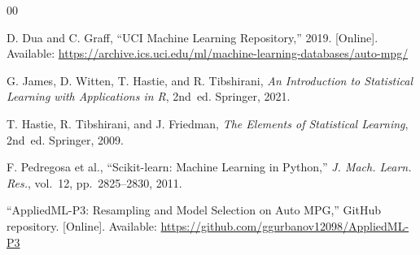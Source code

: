 \documentclass[conference]{IEEEtran}
\begin{document}
\begin{thebibliography}{00}
\sloppy

 D. Dua and C. Graff, ``UCI Machine Learning Repository,'' 2019. [Online]. Available: \url{https://archive.ics.uci.edu/ml/machine-learning-databases/auto-mpg/}

 G. James, D. Witten, T. Hastie, and R. Tibshirani, \textit{An Introduction to Statistical Learning with Applications in R}, 2nd~ed. Springer, 2021.

 T. Hastie, R. Tibshirani, and J. Friedman, \textit{The Elements of Statistical Learning}, 2nd~ed. Springer, 2009.

 F. Pedregosa et al., ``Scikit-learn: Machine Learning in Python,'' \textit{J. Mach. Learn. Res.}, vol.~12, pp.~2825--2830, 2011.

 ``AppliedML-P3: Resampling and Model Selection on Auto MPG,'' GitHub repository. [Online]. Available: \url{https://github.com/ggurbanov12098/AppliedML-P3}

\end{thebibliography}
\end{document}

